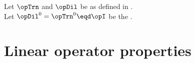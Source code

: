 \begin{proposition}
\label{prop:DjTn}
Let $\opTrn$ and $\opDil$ be as defined in .\\
Let $\opDil^0=\opTrn^0\eqd\opI$ be the .
\end{proposition}
%
%

\section{Linear operator properties}

